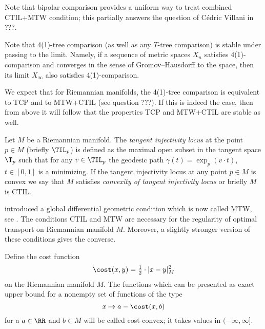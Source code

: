 
Note that bipolar comparison provides a uniform way to treat combined CTIL+MTW condition;
this partially answers the question of Cédric Villani in ???.

Note that 4(1)-tree comparison (as well as any $T$-tree comparison) is stable under passing to the limit.
Namely, if a sequence of metric spaces $X_n$ satisfies 4(1)-comparison and converges in the sense of Gromov--Hausdorff to the space, then its limit $X_\infty$ also satisfies 4(1)-comparison.

We expect that for Riemannian manifolds, the 4(1)-tree comparison is equivalent to TCP and to MTW+CTIL (see question ???).
If this is indeed the case, then from above it will follow that the properties TCP and MTW+CTIL are stable as well.






















Let $M$ be a Riemannian manifold.
The \emph{tangent injectivity locus} at the point $p\in M$ (briefly $\TIL_p$) is defined as the maximal open subset in the tangent space $\T_p$ such that for any $v\in\TIL_p$ the geodesic path $\gamma(t)=\exp_p(v\cdot t)$, $t\in [0,1]$ is a minimizing.
If the tangent injectivity locus at any point $p\in M$ is convex we say that $M$ satisfies \emph{convexity of  tangent injectivity locus} or briefly $M$ is CTIL.

 introduced a global differential geometric condition which is now called MTW, see .
The conditions CTIL and MTW are necessary for the regularity of optimal transport on Riemannian manifold $M$.
Moreover, a slightly stronger version of these conditions gives the converse.












Define the cost function
\[\cost(x,y)=\tfrac12\cdot|x-y|_M^2\]
on the Riemannian manifold $M$.
The functions which can be presented as exact upper bound for a nonempty set of functions of the type 
\[x\mapsto a- \cost(x,b)\]
for a $a\in \RR$ and $b\in M$ will be called cost-convex;
it takes values in $(-\infty,\infty]$.

